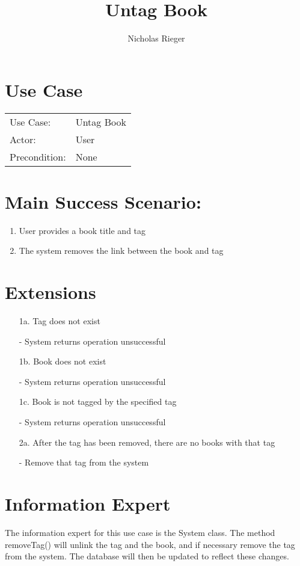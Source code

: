 \documentclass{article}
\title{Untag Book}
\author{Nicholas Rieger}
\begin{document}
\maketitle

\section*{Use Case}
\begin{tabular}{l l}
  Use Case:     & Untag Book \\
  Actor:        & User       \\
  Precondition: & None       \\
\end{tabular}

\section*{Main Success Scenario:}
\begin{enumerate}
    \item User provides a book title and tag
    \item The system removes the link between the book and tag
\end{enumerate}

\section*{Extensions}
\begin{itemize}
    \item[1a.] Tag does not exist
      
      - System returns operation unsuccessful
    \item[1b.] Book does not exist

      - System returns operation unsuccessful
    \item[1c.] Book is not tagged by the specified tag
      
      - System returns operation unsuccessful
    \item[2a.] After the tag has been removed, there are no books with that tag
     
      - Remove that tag from the system
\end{itemize}

\section*{Information Expert}
The information expert for this use case is the System class.
The method removeTag() will unlink the tag and the book, and if
necessary remove the tag from the system. The database will then
be updated to reflect these changes.
\end{document}
